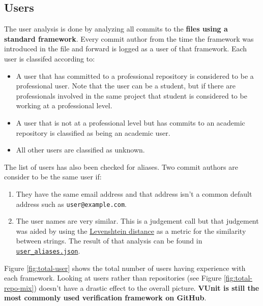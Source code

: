 \documentclass[]{article}
\providecommand{\tightlist}{%
  \setlength{\itemsep}{0pt}\setlength{\parskip}{0pt}}
\begin{document}
\hypertarget{users}{%
\subsection{Users}\label{users}}

The user analysis is done by analyzing all commits to the \textbf{files using a standard framework}. Every commit author from the time the framework was introduced in the file and forward is logged as a user of that framework. Each user is classifed according to:

\begin{itemize}
\tightlist
\item
  A user that has committed to a professional repository is considered to be a professional user. Note that the user can be a student, but if there are professionals involved in the same project that student is considered to be working at a professional level.
\item
  A user that is not at a professional level but has commits to an academic repository is classified as being an academic user.
\item
  All other users are classified as unknown.
\end{itemize}

The list of users has also been checked for aliases. Two commit authors are consider to be the same user if:

\begin{enumerate}
\def\labelenumi{\arabic{enumi}.}
\tightlist
\item
  They have the same email address and that address isn't a common default address such as \texttt{user@example.com}.
\item
  The user names are very similar. This is a judgement call but that judgement was aided by using the \href{https://en.wikipedia.org/wiki/Levenshtein_distance}{Levenshtein distance} as a metric for the similarity between strings. The result of that analysis can be found in \href{https://github.com/LarsAsplund/github-facts/tree/main/user_aliases.json}{\texttt{user\_aliases.json}}.
\end{enumerate}

Figure \ref{fig:total-user} shows the total number of users having experience with each framework. Looking at users rather than repositories (see Figure \ref{fig:total-repo-mix}) doesn't have a drastic effect to the overall picture. \textbf{VUnit is still the most commonly used verification framework on GitHub}.
\end{document}
